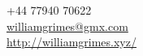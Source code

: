 \documentclass[margin,line]{resume}
\begin{document}
{
    \hfill +44 77940 70622                                           \ \Mobilefone     \vspace{0mm}\\\vspace{0mm}%
    \hfill \href{mailto:williamgrimes@gmx.com}{williamgrimes@gmx.com} \ \Letter        \vspace{0mm}\\\vspace{0mm}%
    \hfill \url{http://williamgrimes.xyz/} \                            \ComputerMouse \vspace{0mm}\\\vspace{-10mm}%
}
\end{document}
